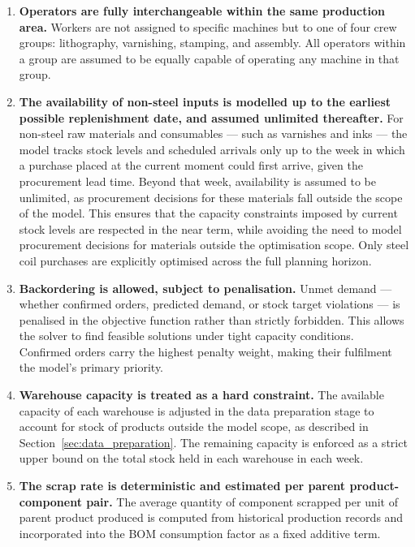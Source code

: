 \documentclass{article}
\begin{document}
\begin{enumerate}
    \item \textbf{Operators are fully interchangeable within the same production area.} Workers are not assigned to specific machines but to one of four crew groups: lithography, varnishing, stamping, and assembly. All operators within a group are assumed to be equally capable of operating any machine in that group.

    \item \textbf{The availability of non-steel inputs is modelled up to the earliest possible replenishment date, and assumed unlimited thereafter.} For non-steel raw materials and consumables --- such as varnishes and inks --- the model tracks stock levels and scheduled arrivals only up to the week in which a purchase placed at the current moment could first arrive, given the procurement lead time. Beyond that week, availability is assumed to be unlimited, as procurement decisions for these materials fall outside the scope of the model. This ensures that the capacity constraints imposed by current stock levels are respected in the near term, while avoiding the need to model procurement decisions for materials outside the optimisation scope. Only steel coil purchases are explicitly optimised across the full planning horizon.

    \item \textbf{Backordering is allowed, subject to penalisation.} Unmet demand --- whether confirmed orders, predicted demand, or stock target violations --- is penalised in the objective function rather than strictly forbidden. This allows the solver to find feasible solutions under tight capacity conditions. Confirmed orders carry the highest penalty weight, making their fulfilment the model's primary priority.

    \item \textbf{Warehouse capacity is treated as a hard constraint.} The available capacity of each warehouse is adjusted in the data preparation stage to account for stock of products outside the model scope, as described in Section~\ref{sec:data_preparation}. The remaining capacity is enforced as a strict upper bound on the total stock held in each warehouse in each week.

    \item \textbf{The scrap rate is deterministic and estimated per parent product-component pair.} The average quantity of component scrapped per unit of parent product produced is computed from historical production records and incorporated into the BOM consumption factor as a fixed additive term.


\end{enumerate}
\end{document}
